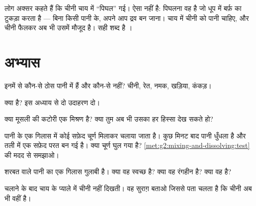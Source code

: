 \begin{remark}[घुलना पिघलना नहीं है]\label{rem:g2:mixing-and-dissolving:not-melting}
लोग अक्सर कहते हैं कि चीनी चाय में ``पिघल'' गई। ऐसा नहीं है: पिघलना
वह है जो धूप में बर्फ़ का टुकड़ा करता है --- बिना किसी पानी के, अपने आप
द्रव बन जाना। चाय में चीनी को पानी चाहिए, और चीनी फैलकर अब भी उसमें
मौजूद है। सही शब्द है \emph{}।
\end{remark}

\section{अभ्यास}

\begin{exercise}[$\star$]\label{exo:g2:mixing-and-dissolving:1}
इनमें से कौन-से ठोस पानी में  हैं और कौन-से नहीं? चीनी,
रेत, नमक, खड़िया, कंकड़।
\end{exercise}

\begin{exercise}[$\star$]\label{exo:g2:mixing-and-dissolving:2}
 क्या है? इस अध्याय से दो उदाहरण दो।
\end{exercise}

\begin{exercise}[$\star$]\label{exo:g2:mixing-and-dissolving:3}
क्या मूसली की कटोरी एक मिश्रण है? क्या तुम अब भी उसका हर हिस्सा देख सकते हो?
\end{exercise}

\begin{exercise}[$\star$]\label{exo:g2:mixing-and-dissolving:4}
पानी के एक गिलास में कोई सफ़ेद चूर्ण मिलाकर चलाया जाता है। कुछ मिनट बाद
पानी धुँधला है और तली में एक सफ़ेद परत बन गई है। क्या चूर्ण घुल गया
है? \cref{met:g2:mixing-and-dissolving:test} की मदद से
समझाओ।
\end{exercise}

\begin{exercise}[$\star$]\label{exo:g2:mixing-and-dissolving:5}
शरबत वाले पानी का एक गिलास गुलाबी है। क्या वह स्वच्छ है? क्या वह रंगहीन है? क्या वह
 है?
\end{exercise}

\begin{exercise}[$\star$]\label{exo:g2:mixing-and-dissolving:6}
चलाने के बाद चाय के प्याले में चीनी नहीं दिखती। वह सुराग़ बताओ जिससे
पता चलता है कि चीनी अब भी वहीं है।
\end{exercise}

